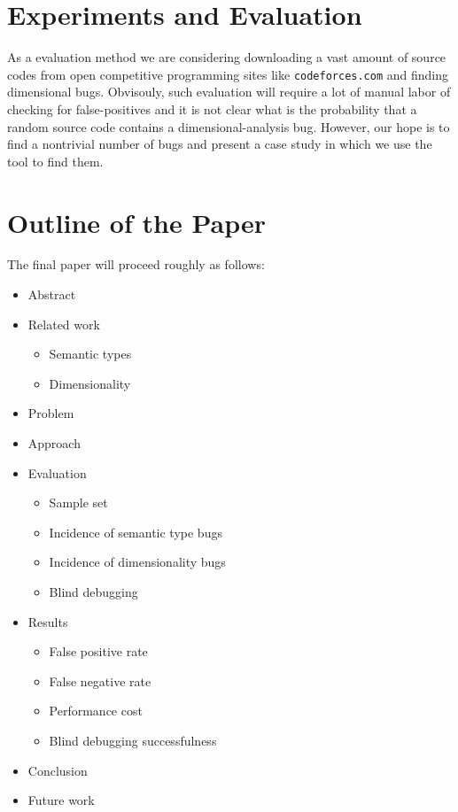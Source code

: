 \documentclass[12pt]{article}
\begin{document}
\section{Experiments and Evaluation}

As a evaluation method we are considering downloading a vast amount of source codes from open competitive programming sites like \texttt{codeforces.com} and finding dimensional bugs. Obvisouly, such evaluation will require a lot of manual labor of checking for false-positives and it is not clear what is the probability that a random source code contains a dimensional-analysis bug. However, our hope is to find a nontrivial number of bugs and present a case study in which we use the tool to find them.

\section{Outline of the Paper}

The final paper will proceed roughly as follows:

\begin{itemize}
\item Abstract
\item Related work
\begin{itemize}
	\item Semantic types
	\item Dimensionality
\end{itemize}
\item Problem
\item Approach
\item Evaluation
\begin{itemize}
	\item Sample set
	\item Incidence of semantic type bugs
	\item Incidence of dimensionality bugs
	\item Blind debugging
\end{itemize}
\item Results
\begin{itemize}
	\item False positive rate
	\item False negative rate
	\item Performance cost
	\item Blind debugging successfulness
\end{itemize}
\item Conclusion
\item Future work
\end{itemize}




\end{document}

